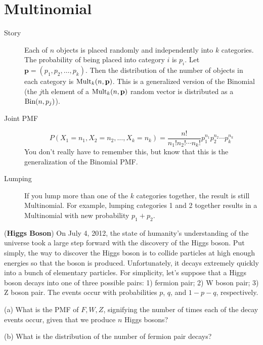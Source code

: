 \documentclass{article}
\begin{document}
\section{Multinomial}

\begin{description}

\item[Story] Each of $n$ objects is placed randomly and independently into $k$ categories. The probability of being placed into category $i$ is $p_i$. Let $\mathbf{p} = (p_1, p_2, \dots, p_k)$. Then the distribution of the number of objects in each category is $\textrm{Mult}_k(n, \mathbf{p})$. This is a generalized version of the Binomial (the $j$th element of a $\textrm{Mult}_k(n, \mathbf{p})$ random vector is distributed as a $\textrm{Bin}(n, p_j)$).

\item[Joint PMF] $$P(X_1 = n_1, X_2 = n_2, \dots, X_k = n_k) = \frac{n!}{n_1!n_2!\cdots n_k!}p_1^{n_1}p_2^{n_2}\cdots p_k^{n_k}$$ You don't really have to remember this, but know that this is the generalization of the Binomial PMF.

\item[Lumping] If you lump more than one of the $k$ categories together, the result is still Multinomial. For example, lumping categories 1 and 2 together results in a Multinomial with new probability $p_1 + p_2$.

\end{description}

({\bf Higgs Boson}) On July 4, 2012, the state of humanity's understanding of the universe took a large step forward with the discovery of the Higgs boson. Put simply, the way to discover the Higgs boson is to collide particles at high enough energies so that the boson is produced. Unfortunately, it decays extremely quickly into a bunch of elementary particles. For simplicity, let's suppose that a Higgs boson decays into one of three possible pairs: 1) fermion pair; 2) W boson pair; 3) Z boson pair. The events occur with probabilities $p$, $q$, and $1-p-q$, respectively. 

(a) What is the PMF of $F, W, Z$, signifying the number of times each of the decay events occur, given that we produce $n$ Higgs bosons?


(b) What is the distribution of the number of fermion pair decays?

\end{document}
